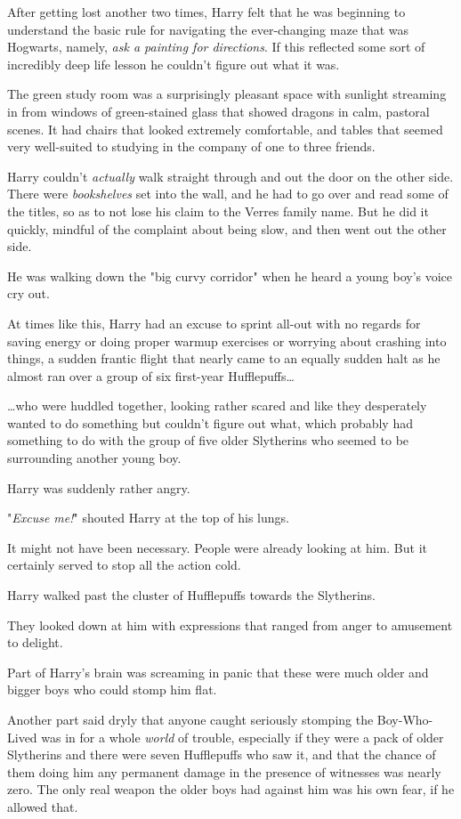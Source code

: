 After getting lost another two times, Harry felt that he was beginning to
understand the basic rule for navigating the ever-changing maze that was
Hogwarts, namely, \emph{ask a painting for directions}. If this reflected some
sort of incredibly deep life lesson he couldn't figure out what it was.

The green study room was a surprisingly pleasant space with sunlight streaming
in from windows of green-stained glass that showed dragons in calm, pastoral
scenes. It had chairs that looked extremely comfortable, and tables that seemed
very well-suited to studying in the company of one to three friends.

Harry couldn't \emph{actually} walk straight through and out the door on the
other side. There were \emph{bookshelves} set into the wall, and he had to go
over and read some of the titles, so as to not lose his claim to the Verres
family name. But he did it quickly, mindful of the complaint about being slow,
and then went out the other side.

He was walking down the "big curvy corridor" when he heard a young boy's voice
cry out.

At times like this, Harry had an excuse to sprint all-out with no regards for
saving energy or doing proper warmup exercises or worrying about crashing into
things, a sudden frantic flight that nearly came to an equally sudden halt as
he almost ran over a group of six first-year Hufflepuffs{\ldots}

{\ldots}who were huddled together, looking rather scared and like they
desperately wanted to do something but couldn't figure out what, which probably
had something to do with the group of five older Slytherins who seemed to be
surrounding another young boy.

Harry was suddenly rather angry.

"\emph{Excuse me!}" shouted Harry at the top of his lungs.

It might not have been necessary. People were already looking at him. But it
certainly served to stop all the action cold.

Harry walked past the cluster of Hufflepuffs towards the Slytherins.

They looked down at him with expressions that ranged from anger to amusement to
delight.

Part of Harry's brain was screaming in panic that these were much older and
bigger boys who could stomp him flat.

Another part said dryly that anyone caught seriously stomping the Boy-Who-Lived
was in for a whole \emph{world} of trouble, especially if they were a pack of
older Slytherins and there were seven Hufflepuffs who saw it, and that the
chance of them doing him any permanent damage in the presence of witnesses was
nearly zero. The only real weapon the older boys had against him was his own
fear, if he allowed that.

